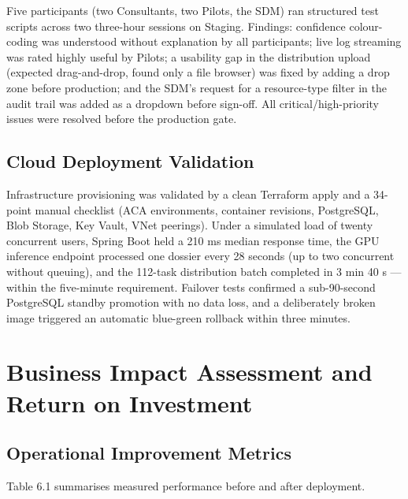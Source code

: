 Five participants (two Consultants, two Pilots, the SDM) ran structured test scripts across two three-hour sessions on Staging. Findings: confidence colour-coding was understood without explanation by all participants; live log streaming was rated highly useful by Pilots; a usability gap in the distribution upload (expected drag-and-drop, found only a file browser) was fixed by adding a drop zone before production; and the SDM's request for a resource-type filter in the audit trail was added as a dropdown before sign-off. All critical/high-priority issues were resolved before the production gate.

\subsection{Cloud Deployment Validation}

Infrastructure provisioning was validated by a clean Terraform apply and a 34-point manual checklist (ACA environments, container revisions, PostgreSQL, Blob Storage, Key Vault, VNet peerings). Under a simulated load of twenty concurrent users, Spring Boot held a 210 ms median response time, the GPU inference endpoint processed one dossier every 28 seconds (up to two concurrent without queuing), and the 112-task distribution batch completed in 3 min 40 s — within the five-minute requirement. Failover tests confirmed a sub-90-second PostgreSQL standby promotion with no data loss, and a deliberately broken image triggered an automatic blue-green rollback within three minutes.

\bigskip

\section{Business Impact Assessment and Return on Investment}

\subsection{Operational Improvement Metrics}

Table 6.1 summarises measured performance before and after deployment.

